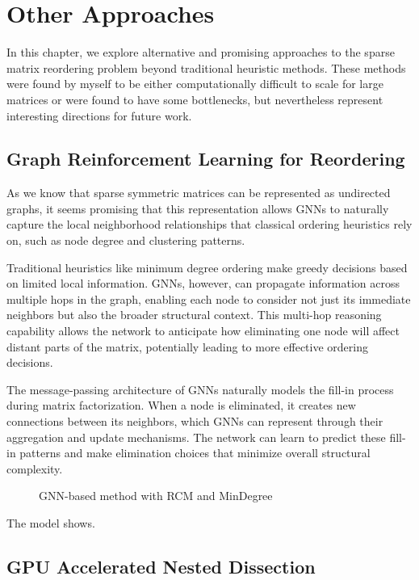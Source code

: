 \chapter{Other Approaches}
\label{ch:other_approaches}

In this chapter, we explore alternative and promising approaches to the sparse matrix reordering problem beyond traditional heuristic methods. These methods were found by myself to be either computationally difficult to scale for large matrices or were found to have some bottlenecks, but nevertheless represent interesting directions for future work. 

\section{Graph Reinforcement Learning for Reordering}

As we know that sparse symmetric matrices can be represented as undirected graphs, it seems promising that this representation allows GNNs to naturally capture the local neighborhood relationships that classical ordering heuristics rely on, such as node degree and clustering patterns.

Traditional heuristics like minimum degree ordering make greedy decisions based on limited local information. GNNs, however, can propagate information across multiple hops in the graph, enabling each node to consider not just its immediate neighbors but also the broader structural context. This multi-hop reasoning capability allows the network to anticipate how eliminating one node will affect distant parts of the matrix, potentially leading to more effective ordering decisions.

The message-passing architecture of GNNs naturally models the fill-in process during matrix factorization. When a node is eliminated, it creates new connections between its neighbors, which GNNs can represent through their aggregation and update mechanisms. The network can learn to predict these fill-in patterns and make elimination choices that minimize overall structural complexity.

\begin{figure}[htbp]
    \centering
    \begin{bchart}[step=20,max=100,unit=\%]
        \smallskip
    \end{bchart}
    \caption{GNN-based method with RCM and MinDegree}
    \label{fig:graphrl_small}
\end{figure}

The model shows.

\section{GPU Accelerated Nested Dissection}